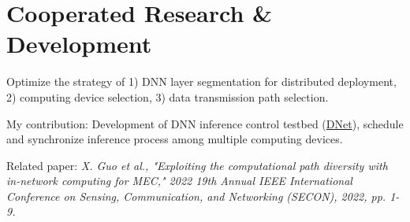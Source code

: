 \documentclass[]{deedy-resume-openfont}
\begin{document}
\begin{minipage}[t]{0.77\textwidth}
\section{Cooperated Research \& Development}
\begin{tightemize}
    \item Optimize the strategy of 1) DNN layer segmentation for distributed deployment, 2) computing device selection, 3) data transmission path selection.
    \item My contribution: Development of DNN inference control testbed (\href{https://github.com/yindaheng98/DNet}{DNet}), schedule and synchronize inference process among multiple computing devices.
    \item Related paper: \textit{X. Guo et al., "Exploiting the computational path diversity with in-network computing for MEC," 2022 19th Annual IEEE International Conference on Sensing, Communication, and Networking (SECON), 2022, pp. 1-9.}
\end{tightemize}
\sectionsep

\end{minipage} 
\end{document}
